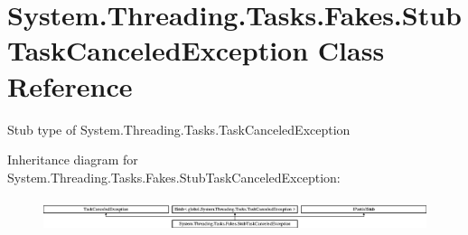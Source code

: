 \hypertarget{class_system_1_1_threading_1_1_tasks_1_1_fakes_1_1_stub_task_canceled_exception}{\section{System.\-Threading.\-Tasks.\-Fakes.\-Stub\-Task\-Canceled\-Exception Class Reference}
\label{class_system_1_1_threading_1_1_tasks_1_1_fakes_1_1_stub_task_canceled_exception}
}


Stub type of System.\-Threading.\-Tasks.\-Task\-Canceled\-Exception 


Inheritance diagram for System.\-Threading.\-Tasks.\-Fakes.\-Stub\-Task\-Canceled\-Exception\-:\begin{figure}[H]
\begin{center}
\leavevmode
\includegraphics[height=0.967185cm]{class_system_1_1_threading_1_1_tasks_1_1_fakes_1_1_stub_task_canceled_exception}
\end{center}
\end{figure}
